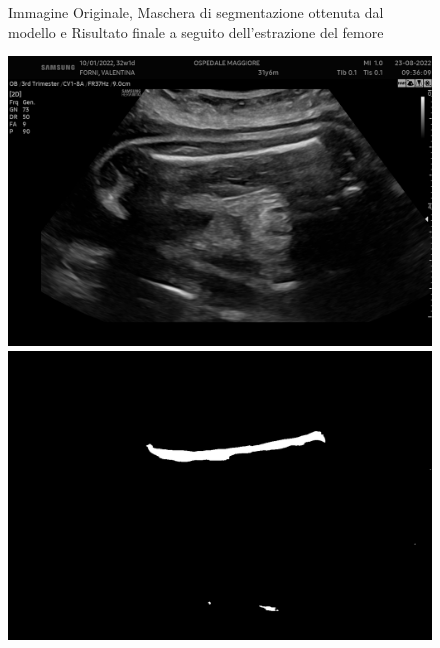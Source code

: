 \begin{figure}[!ht]
\begin{minipage}{0.32\textwidth}
	\end{minipage}
	\caption{Immagine Originale, Maschera di segmentazione ottenuta dal modello e Risultato finale a seguito dell'estrazione del femore}
\end{figure}

\begin{figure}[!ht]
	\centering
	\begin{minipage}{0.32\textwidth}
		\centering
		\includegraphics[width=\textwidth]{./Immagini/nuovo_ecografo_results/4_image.png}
	\end{minipage}
	\hfill %
	\begin{minipage}{0.32\textwidth}
		\centering
		\includegraphics[width=\textwidth]{./Immagini/nuovo_ecografo_results/4_mask.png}
	\end{minipage}
	\hfill %
	\begin{minipage}{0.32\textwidth}

\end{minipage}
\end{figure}

